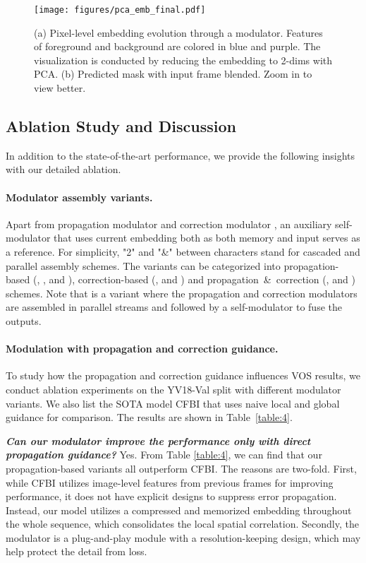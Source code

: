 \documentclass[letterpaper]{article} \usepackage{aaai22}  \usepackage{times}  \usepackage{helvet}  \usepackage{courier}  \usepackage[hyphens]{url}  \usepackage{graphicx} \urlstyle{rm} \def\UrlFont{\rm}  \usepackage{natbib}  \usepackage{caption} \DeclareCaptionStyle{ruled}{labelfont=normalfont,labelsep=colon,strut=off} \frenchspacing  \setlength{\pdfpagewidth}{8.5in}  \setlength{\pdfpageheight}{11in}  \usepackage{algorithm}
\newcommand{\tab}[1]{Table~#1}
\begin{document}
 \begin{figure}[t]
		\centering
		\texttt{[image: figures/pca\_emb\_final.pdf]}\caption{(a) Pixel-level embedding evolution through a  modulator. Features of foreground and background are colored in blue and purple. The visualization is conducted by reducing the embedding to 2-dims with PCA. (b) Predicted mask with input frame blended. Zoom in to view better.}
		\label{fig:pca_embedding} 
\end{figure}
 \subsection{Ablation Study and Discussion}
\label{sec:ablation_study}
In addition to the state-of-the-art performance, we provide the following insights with our detailed ablation.

\paragraph{Modulator assembly variants.}
Apart from propagation modulator  and correction modulator , an auxiliary self-modulator  that uses current embedding both as both memory and input serves as a reference. For simplicity, "2" and "\&" between characters stand for cascaded and parallel assembly schemes. The variants can be categorized into propagation-based (, ,  and ), correction-based (,  and ) and propagation~\&~correction (,  and ) schemes. Note that  is a variant where the propagation and correction modulators are assembled in parallel streams and followed by a self-modulator to fuse the outputs.

\paragraph{Modulation with propagation and correction guidance.}
To study how the propagation and correction guidance influences VOS results, we conduct ablation experiments on the YV18-Val split with different modulator variants.
We also list the SOTA model CFBI that uses naive local and global guidance for comparison.
The results are shown in \tab{\ref{table:4}}.

\textbf{\textit{Can our modulator improve the performance only with direct propagation guidance?}} Yes. From Table \ref{table:4}, we can find that our propagation-based variants all outperform CFBI. The reasons are two-fold. First, while CFBI utilizes image-level features from previous frames for improving performance, it does not have explicit designs to suppress error propagation. Instead, our model utilizes a compressed and memorized embedding throughout the whole sequence, which consolidates the local spatial correlation. Secondly, the modulator is a plug-and-play module with a resolution-keeping design, which may help protect the detail from loss.
\end{document}
